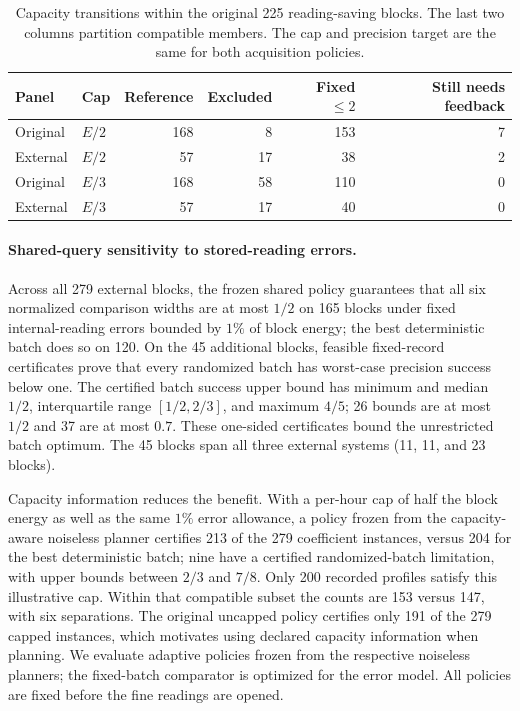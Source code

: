 \documentclass[12pt]{article}
\begin{document}
\begin{table}[htbp]\centering\small
\caption{Capacity transitions within the original 225 reading-saving blocks.
The last two columns partition compatible members. The cap and precision
target are the same for both acquisition policies.}
\label{tab:paired-capacity}
\begin{tabular}{llrrrr}\toprule
Panel & Cap & Reference & Excluded & Fixed $\leq2$ & Still needs feedback\\\midrule
Original & $E/2$ & 168 & 8 & 153 & 7\\
External & $E/2$ & 57 & 17 & 38 & 2\\
Original & $E/3$ & 168 & 58 & 110 & 0\\
External & $E/3$ & 57 & 17 & 40 & 0\\\bottomrule
\end{tabular}
\end{table}

\FloatBarrier
\paragraph{Shared-query sensitivity to stored-reading errors.}
Across all 279 external blocks, the frozen shared policy guarantees that
all six normalized comparison widths are at most $1/2$ on 165 blocks under
fixed internal-reading errors bounded by $1\%$ of block energy; the best
deterministic batch does so on 120.  On the 45 additional blocks,
feasible fixed-record certificates prove that every randomized batch has
worst-case precision success below one.  The certified batch success
upper bound has minimum and median $1/2$, interquartile range
$[1/2,2/3]$, and maximum $4/5$; 26 bounds are at most $1/2$ and 37 are
at most $0.7$. These one-sided certificates bound the unrestricted batch
optimum. The 45 blocks span all three
external systems (11, 11, and 23 blocks).

Capacity information reduces the benefit.  With a per-hour cap of half
the block energy as well as the same $1\%$ error allowance, a policy
frozen from the capacity-aware noiseless planner certifies 213 of the
279 coefficient instances, versus 204 for the best deterministic batch;
nine have a certified randomized-batch limitation, with upper bounds
between $2/3$ and $7/8$.  Only 200 recorded profiles satisfy this illustrative
cap.  Within that compatible subset the counts are 153 versus 147, with
six separations.  The original uncapped policy certifies only 191 of the
279 capped instances, which motivates using declared capacity information
when planning. We evaluate adaptive policies frozen from the respective
noiseless planners; the fixed-batch comparator is optimized for the error
model. All policies are fixed before the fine readings are opened.
\end{document}
